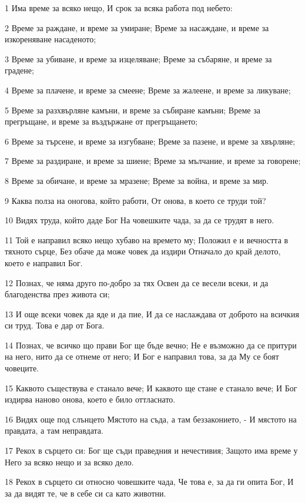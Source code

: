 \par 1 Има време за всяко нещо, И срок за всяка работа под небето:
\par 2 Време за раждане, и време за умиране; Време за насаждане, и време за изкореняване насаденото;
\par 3 Време за убиване, и време за изцеляване; Време за събаряне, и време за градене;
\par 4 Време за плачене, и време за смеене; Време за жалеене, и време за ликуване;
\par 5 Време за разхвърляне камъни, и време за събиране камъни; Време за прегръщане, и време за въздържане от прегръщането;
\par 6 Време за търсене, и време за изгубване; Време за пазене, и време за хвърляне;
\par 7 Време за раздиране, и време за шиене; Време за мълчание, и време за говорене;
\par 8 Време за обичане, и време за мразене; Време за война, и време за мир.
\par 9 Каква полза на оногова, който работи, От онова, в което се труди той?
\par 10 Видях труда, който даде Бог На човешките чада, за да се трудят в него.
\par 11 Той е направил всяко нещо хубаво на времето му; Положил е и вечността в тяхното сърце, Без обаче да може човек да издири Отначало до край делото, което е направил Бог.
\par 12 Познах, че няма друго по-добро за тях Освен да се весели всеки, и да благоденства през живота си;
\par 13 И още всеки човек да яде и да пие, И да се наслаждава от доброто на всичкия си труд. Това е дар от Бога.
\par 14 Познах, че всичко що прави Бог ще бъде вечно; Не е възможно да се притури на него, нито да се отнеме от него; И Бог е направил това, за да Му се боят човеците.
\par 15 Каквото съществува е станало вече; И каквото ще стане е станало вече; И Бог издирва наново онова, което е било оттласнато.
\par 16 Видях още под слънцето Мястото на съда, а там беззаконието, - И мястото на правдата, а там неправдата.
\par 17 Рекох в сърцето си: Бог ще съди праведния и нечестивия; Защото има време у Него за всяко нещо и за всяко дело.
\par 18 Рекох в сърцето си относно човешките чада, Че това е, за да ги опита Бог, И за да видят те, че в себе си са като животни.
